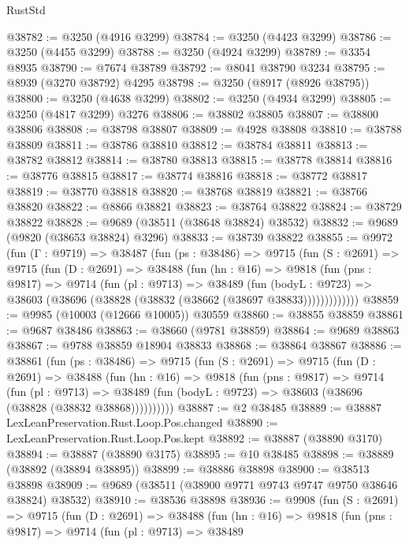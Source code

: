\begin{lexlean}{RustStd}
\begin{coremodule}
@38782 := @3250 (@4916 @3299)
@38784 := @3250 (@4423 @3299)
@38786 := @3250 (@4455 @3299)
@38788 := @3250 (@4924 @3299)
@38789 := @3354 @8935
@38790 := @7674 @38789
@38792 := @8041 @38790 @3234
@38795 := @8939 (@3270 @38792) @4295
@38798 := @3250 (@8917 (@8926 @38795))
@38800 := @3250 (@4638 @3299)
@38802 := @3250 (@4934 @3299)
@38805 := @3250 (@4817 @3299) @3276
@38806 := @38802 @38805
@38807 := @38800 @38806
@38808 := @38798 @38807
@38809 := @4928 @38808
@38810 := @38788 @38809
@38811 := @38786 @38810
@38812 := @38784 @38811
@38813 := @38782 @38812
@38814 := @38780 @38813
@38815 := @38778 @38814
@38816 := @38776 @38815
@38817 := @38774 @38816
@38818 := @38772 @38817
@38819 := @38770 @38818
@38820 := @38768 @38819
@38821 := @38766 @38820
@38822 := @8866 @38821
@38823 := @38764 @38822
@38824 := @38729 @38822
@38828 := @9689 (@38511 (@38648 @38824) @38532)
@38832 := @9689 (@9820 (@38653 @38824) @3296)
@38833 := @38739 @38822
@38855 := @9972
    (fun (Γ : @9719) =>
    @38487
      (fun (ps : @38486) =>
      @9715
        (fun (S : @2691) =>
        @9715
          (fun (D : @2691) =>
          @38488
            (fun (hn : @16) =>
            @9818
              (fun (pns : @9817) =>
              @9714
                (fun (pl : @9713) =>
                @38489
                  (fun (bodyL : @9723) =>
                  @38603 (@38696 (@38828 (@38832 (@38662 (@38697 @38833)))))))))))))
@38859 := @9985 (@10003 (@12666 @10005)) @30559
@38860 := @38855 @38859
@38861 := @9687 @38486
@38863 := @38660 (@9781 @38859)
@38864 := @9689 @38863
@38867 := @9788 @38859 @18904 @38833
@38868 := @38864 @38867
@38886 := @38861
    (fun (ps : @38486) =>
    @9715
      (fun (S : @2691) =>
      @9715
        (fun (D : @2691) =>
        @38488
          (fun (hn : @16) =>
          @9818
            (fun (pns : @9817) =>
            @9714
              (fun (pl : @9713) =>
              @38489 (fun (bodyL : @9723) => @38603 (@38696 (@38828 (@38832 @38868))))))))))
@38887 := @2 @38485
@38889 := @38887 LexLeanPreservation.Rust.Loop.Pos.changed
@38890 := LexLeanPreservation.Rust.Loop.Pos.kept
@38892 := @38887 (@38890 @3170)
@38894 := @38887 (@38890 @3175)
@38895 := @10 @38485
@38898 := @38889 (@38892 (@38894 @38895))
@38899 := @38886 @38898
@38900 := @38513 @38898
@38909 := @9689 (@38511 (@38900 @9771 @9743 @9747 @9750 @38646 @38824) @38532)
@38910 := @38536 @38898
@38936 := @9908
    (fun (S : @2691) =>
    @9715
      (fun (D : @2691) =>
      @38488
        (fun (hn : @16) =>
        @9818
          (fun (pns : @9817) =>
          @9714
            (fun (pl : @9713) =>
            @38489

\end{coremodule}
\end{lexlean}
